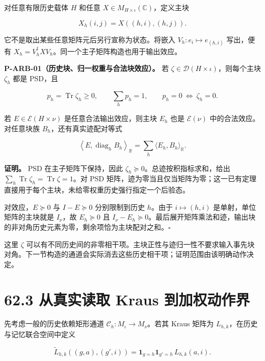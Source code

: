\documentclass[
  11pt,
  oneside]{book}
\begin{document}
对任意有限历史载体 \(H\) 和任意
\(X\in M_{H\times\iota}(\mathbb C)\)，定义主块

\[
X_h(i,j)=X((h,i),(h,j)).
\]

它不是取出某些任意矩阵元后另行宣称为状态。将嵌入
\(V_h:e_i\mapsto e_{(h,i)}\) 写出，便有
\(X_h=V_h^\dagger XV_h\)。同一个主子矩阵构造也用于输出效应。

\protect\hypertarget{p-arb-01}{}{}

\textbf{P-ARB-01（历史块、归一权重与合法块效应）。} 若
\(\zeta\in\mathcal D(H\times\iota)\)，则每个主块 \(\zeta_h\) 都是
PSD，且

\[
p_h=\operatorname{Tr}\zeta_h\ge0,
\qquad \sum_h p_h=1,
\qquad p_h=0\ \Longleftrightarrow\ \zeta_h=0.
\]

若 \(E\in\mathcal E(H\times\nu)\) 是任意合法输出效应，则主块 \(E_h\)
也是 \(\mathcal E(\nu)\) 中的合法效应。对任意块族
\(B_h\)，还有真实迹配对等式

\[
\left\langle E,\operatorname{diag}_hB_h\right\rangle_{\mathbb R}
=\sum_h\langle E_h,B_h\rangle_{\mathbb R}.
\]

\textbf{证明。} PSD 在主子矩阵下保持，因此
\(\zeta_h\succeq0\)。总迹按积指标求和，给出
\(\sum_h\operatorname{Tr}\zeta_h=\operatorname{Tr}\zeta=1\)。对 PSD
矩阵，迹为零当且仅当矩阵为零；这一已有定理直接用于每个主块，未给零权重历史强行指定一个后验态。

对效应，\(E\succeq0\) 与 \(I-E\succeq0\) 分别限制到历史 \(h\)。由于
\(i\mapsto(h,i)\) 是单射，单位矩阵的主块就是 \(I_\nu\)，故
\(E_h\succeq0\) 且
\(I_\nu-E_h\succeq0\)。最后展开矩阵乘法和迹，输出块的非对角历史元素为零，剩余项恰为主块配对之和。\(\square\)

这里 \(\zeta\)
可以有不同历史间的非零相干项。主块正性与迹归一性不要求输入事先块对角。下一节构造的通道会实际消去这些历史相干项；证明范围由该明确动作决定。

\hypertarget{ux4eceux771fux5b9eux8bfbux53d6-kraus-ux5230ux52a0ux6743ux52a8ux4f5cux754c}{%
\section{62.3 从真实读取 Kraus
到加权动作界}\label{ux4eceux771fux5b9eux8bfbux53d6-kraus-ux5230ux52a0ux6743ux52a8ux4f5cux754c}}

先考虑一般的历史依赖矩形通道 \(\mathcal C_h:M_\iota\to M_\nu\)。若其
Kraus 矩阵为 \(L_{h,k}\)，在历史与记忆联合空间中定义

\[
\widetilde L_{h,k}((g,a),(g',i))
=\mathbf 1_{g=h}\mathbf 1_{g'=h}\,L_{h,k}(a,i).
\]
\end{document}
